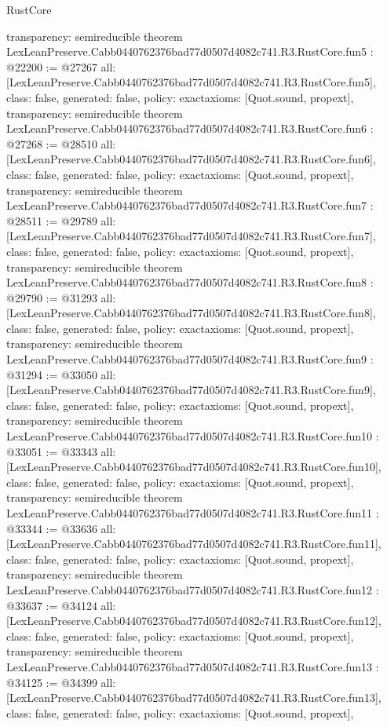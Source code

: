 \begin{lexlean}{RustCore}
\begin{coremodule}
{  transparency: semireducible
}
theorem LexLeanPreserve.Cabb0440762376bad77d0507d4082c741.R3.RustCore.fun5 : @22200 := @27267 {
  all: [LexLeanPreserve.Cabb0440762376bad77d0507d4082c741.R3.RustCore.fun5],
  class: false,
  generated: false,
  policy: exact{axioms: [Quot.sound, propext]},
  transparency: semireducible
}
theorem LexLeanPreserve.Cabb0440762376bad77d0507d4082c741.R3.RustCore.fun6 : @27268 := @28510 {
  all: [LexLeanPreserve.Cabb0440762376bad77d0507d4082c741.R3.RustCore.fun6],
  class: false,
  generated: false,
  policy: exact{axioms: [Quot.sound, propext]},
  transparency: semireducible
}
theorem LexLeanPreserve.Cabb0440762376bad77d0507d4082c741.R3.RustCore.fun7 : @28511 := @29789 {
  all: [LexLeanPreserve.Cabb0440762376bad77d0507d4082c741.R3.RustCore.fun7],
  class: false,
  generated: false,
  policy: exact{axioms: [Quot.sound, propext]},
  transparency: semireducible
}
theorem LexLeanPreserve.Cabb0440762376bad77d0507d4082c741.R3.RustCore.fun8 : @29790 := @31293 {
  all: [LexLeanPreserve.Cabb0440762376bad77d0507d4082c741.R3.RustCore.fun8],
  class: false,
  generated: false,
  policy: exact{axioms: [Quot.sound, propext]},
  transparency: semireducible
}
theorem LexLeanPreserve.Cabb0440762376bad77d0507d4082c741.R3.RustCore.fun9 : @31294 := @33050 {
  all: [LexLeanPreserve.Cabb0440762376bad77d0507d4082c741.R3.RustCore.fun9],
  class: false,
  generated: false,
  policy: exact{axioms: [Quot.sound, propext]},
  transparency: semireducible
}
theorem LexLeanPreserve.Cabb0440762376bad77d0507d4082c741.R3.RustCore.fun10 : @33051 := @33343 {
  all: [LexLeanPreserve.Cabb0440762376bad77d0507d4082c741.R3.RustCore.fun10],
  class: false,
  generated: false,
  policy: exact{axioms: [Quot.sound, propext]},
  transparency: semireducible
}
theorem LexLeanPreserve.Cabb0440762376bad77d0507d4082c741.R3.RustCore.fun11 : @33344 := @33636 {
  all: [LexLeanPreserve.Cabb0440762376bad77d0507d4082c741.R3.RustCore.fun11],
  class: false,
  generated: false,
  policy: exact{axioms: [Quot.sound, propext]},
  transparency: semireducible
}
theorem LexLeanPreserve.Cabb0440762376bad77d0507d4082c741.R3.RustCore.fun12 : @33637 := @34124 {
  all: [LexLeanPreserve.Cabb0440762376bad77d0507d4082c741.R3.RustCore.fun12],
  class: false,
  generated: false,
  policy: exact{axioms: [Quot.sound, propext]},
  transparency: semireducible
}
theorem LexLeanPreserve.Cabb0440762376bad77d0507d4082c741.R3.RustCore.fun13 : @34125 := @34399 {
  all: [LexLeanPreserve.Cabb0440762376bad77d0507d4082c741.R3.RustCore.fun13],
  class: false,
  generated: false,
  policy: exact{axioms: [Quot.sound, propext]},
}
\end{coremodule}
\end{lexlean}
